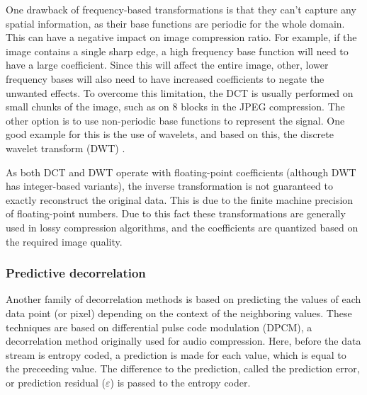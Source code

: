       One drawback of frequency-based transformations is that they can't capture any spatial information, as their base functions are periodic for the whole domain. This can have a negative impact on image compression ratio. For example, if the image contains a single sharp edge, a high frequency base function will need to have a large coefficient. Since this will affect the entire image, other, lower frequency bases will also need to have increased coefficients to negate the unwanted effects.
      To overcome this limitation, the DCT is usually performed on small chunks of the image, such as on 8 blocks in the JPEG compression. The other option is to use non-periodic base functions to represent the signal. One good example for this is the use of wavelets, and based on this, the discrete wavelet transform (DWT) \cite{mallat_theory_1989, jensen_ripples_2001}.

      As both DCT and DWT operate with floating-point coefficients (although DWT has integer-based variants), the inverse transformation is not guaranteed to exactly reconstruct the original data. This is due to the finite machine precision of floating-point numbers. Due to this fact these transformations are generally used in lossy compression algorithms, and the coefficients are quantized based on the required image quality.
      
      
  
      \subsubsection{Predictive decorrelation}
      \label{sec:predictors}
      Another family of decorrelation methods is based on predicting the values of each data point (or pixel) depending on the context of the neighboring values. These techniques are based on differential pulse code modulation (DPCM), a decorrelation method originally used for audio compression. Here, before the data stream is entropy coded, a prediction is made for each value, which is equal to the preceeding value. The difference to the prediction, called the prediction error, or prediction residual ($\varepsilon$) is passed to the entropy coder.


